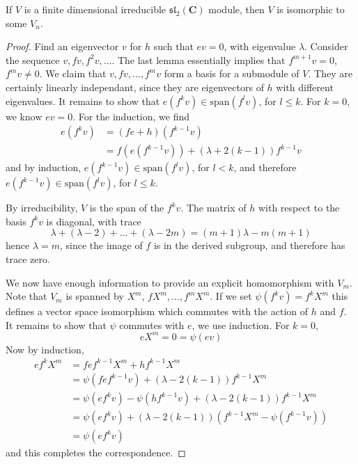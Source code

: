 \begin{theorem}
    If $V$ is a finite dimensional irreducible $\mathfrak{sl}_2(\mathbf{C})$ module, then $V$ is isomorphic to some $V_n$.
\end{theorem}
\begin{proof}
    Find an eigenvector $v$ for $h$ such that $ev = 0$, with eigenvalue $\lambda$. Consider the sequence $v, fv, f^2 v, \dots$. The last lemma essentially implies that $f^{m+1} v = 0$, $f^m v \neq 0$. We claim that $v, fv, \dots, f^m v$ form a basis for a submodule of $V$. They are certainly linearly independant, since they are eigenvectors of $h$ with different eigenvalues. It remains to show that $e(f^k v) \in \text{span}(f^l v)$, for $l \leq k$. For $k = 0$, we know $ev = 0$. For the induction, we find
    \begin{align*}
        e(f^k v) &= (f e + h) (f^{k-1} v)\\
        &= f(e(f^{k-1} v)) + (\lambda + 2(k-1)) f^{k-1} v
    \end{align*}
    and by induction, $e(f^{k-1} v) \in \text{span}(f^l v)$, for $l < k$, and therefore $e(f^{k-1} v) \in \text{span}(f^l v)$, for $l \leq k$.

    By irreducibility, $V$ is the span of the $f^k v$. The matrix of $h$ with respect to the basis $f^k v$ is diagonal, with trace
    \[ \lambda + (\lambda - 2) + \dots + (\lambda - 2m) = (m+1) \lambda - m(m+1) \]
    hence $\lambda = m$, since the image of $f$ is in the derived subgroup, and therefore has trace zero.

    We now have enough information to provide an explicit homomorphism with $V_m$. Note that $V_m$ is spanned by $X^m$, $fX^m, \dots, f^m X^m$. If we set $\psi(f^k v) = f^k X^m$ this defines a vector space isomorphism which commutes with the action of $h$ and $f$. It remains to show that $\psi$ commutes with $e$, we use induction. For $k = 0$,
    \[ eX^m = 0 = \psi(ev) \]
    Now by induction,
    \begin{align*}
        ef^k X^m &= f e f^{k-1} X^m + h f^{k-1} X^m\\
        &= \psi(f e f^{k-1} v) + (\lambda - 2(k-1)) f^{k-1} X^m \\
        &= \psi(ef^k v) - \psi(hf^{k-1} v) + (\lambda - 2(k-1)) f^{k-1} X^m\\
        &= \psi(ef^k v) + (\lambda - 2(k-1))(f^{k-1} X^m - \psi(f^{k-1} v))\\
        &= \psi(ef^k v)
    \end{align*}
    and this completes the correspondence.
\end{proof}


